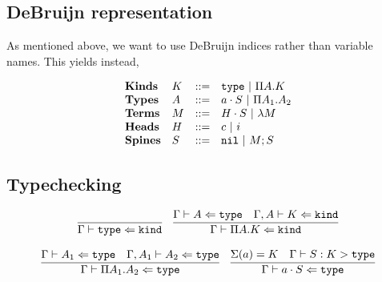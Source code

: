 \documentclass[11pt,twoside]{article}
\begin{document}
\subsection{DeBruijn representation}

As mentioned above, we want to use DeBruijn indices rather
than variable names.  This yields instead,

\renewcommand{\PiTyp}[2]{\Pi #1.#2}
\renewcommand{\Lam}[1]{\lambda #1}

$$
\begin{array}{llll}
\mathbf{Kinds} & K & ::= & \Type \Spb \PiTyp{A}{K} \\
\mathbf{Types} & A & ::= & a\cdot S \Spb \PiTyp{A_1}{A_2} \\
\mathbf{Terms} & M & ::= & H\cdot S \Spb \Lam{M} \\
\mathbf{Heads} & H & ::= & c \Spb i\\
\mathbf{Spines} & S & ::= & \Nil \Spb M;S\\
\end{array} 
$$


\subsection{Typechecking}

\newcommand{\CheckTy}[3][\Gamma]{#1\vdash #2 \Leftarrow #3}
\newcommand{\Focus}[4][\Gamma]{#1\vdash #2 : #3 > #4}
\newcommand{\Equiv}[2]{#1\equiv #2}


\bigskip 
\framebox{$\CheckTy{K}{\Kind}$}
\bigskip 

$$
\begin{array}{cc}
\infer{\CheckTy{\Type}{\Kind}}{} &
\infer{\CheckTy{\PiTyp{A}{K}}{\Kind}}{\CheckTy{A}{\Type} & \CheckTy[\Gamma,A]{K}{\Kind}}
\end{array} 
$$

\bigskip 
\framebox{$\CheckTy{A}{\Type}$}
\bigskip 

$$
\begin{array}{cc}
\infer{\CheckTy{\PiTyp{A_1}{A_2}}{\Type}}{\CheckTy{A_1}{\Type} & \CheckTy[\Gamma,A_1]{A_2}{\Type}} &
\infer{\CheckTy{a\cdot S}{\Type}}{\Sigma(a) = K & \Focus{S}{K}{\Type}}
\end{array} 
$$
\end{document}
